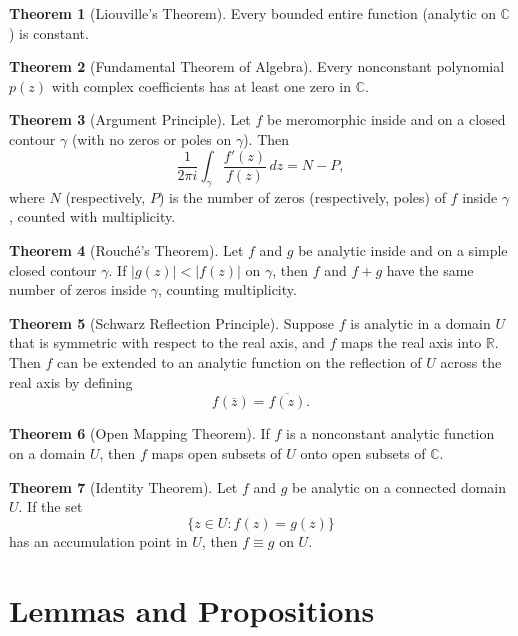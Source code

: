 \documentclass[12pt]{article}
\theoremstyle{definition} %
\newtheorem{theorem}{Theorem}
\theoremstyle{plain} %
\begin{document}
\begin{theorem}[Liouville's Theorem]
Every bounded entire function (analytic on \(\mathbb{C}\)) is constant.
\end{theorem}

\begin{theorem}[Fundamental Theorem of Algebra]
Every nonconstant polynomial \(p(z)\) with complex coefficients has at least one zero in \(\mathbb{C}\).
\end{theorem}

\begin{theorem}[Argument Principle]
Let \(f\) be meromorphic inside and on a closed contour \(\gamma\) (with no zeros or poles on \(\gamma\)). Then
\[
\frac{1}{2\pi i}\int_\gamma \frac{f'(z)}{f(z)}\,dz = N - P,
\]
where \(N\) (respectively, \(P\)) is the number of zeros (respectively, poles) of \(f\) inside \(\gamma\), counted with multiplicity.
\end{theorem}

\begin{theorem}[Rouché's Theorem]
Let \(f\) and \(g\) be analytic inside and on a simple closed contour \(\gamma\). If \(|g(z)| < |f(z)|\) on \(\gamma\), then \(f\) and \(f+g\) have the same number of zeros inside \(\gamma\), counting multiplicity.
\end{theorem}

\begin{theorem}[Schwarz Reflection Principle]
Suppose \(f\) is analytic in a domain \(U\) that is symmetric with respect to the real axis, and \(f\) maps the real axis into \(\mathbb{R}\). Then \(f\) can be extended to an analytic function on the reflection of \(U\) across the real axis by defining
\[
f(\overline{z}) = \overline{f(z)}.
\]
\end{theorem}

\begin{theorem}[Open Mapping Theorem]
If \(f\) is a nonconstant analytic function on a domain \(U\), then \(f\) maps open subsets of \(U\) onto open subsets of \(\mathbb{C}\).
\end{theorem}

\begin{theorem}[Identity Theorem]
Let \(f\) and \(g\) be analytic on a connected domain \(U\). If the set
\[
\{ z \in U : f(z)=g(z) \}
\]
has an accumulation point in \(U\), then \(f\equiv g\) on \(U\).
\end{theorem}

\section{Lemmas and Propositions}
\end{document}
